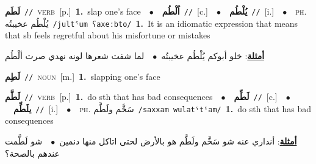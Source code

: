 \documentclass[10pt,a4paper,twoside]{article} %
\begin{document}
\begin{multicols}{2}
{\setlength\topsep{0pt}\textbf{\foreignlanguage{arabic}{لَطَم}}\ {\color{gray}\texttt{//}\color{black}}\ \textsc{verb}\ [p.]\ \textbf{1.}~slap one's face\ \ $\bullet$\ \ \setlength\topsep{0pt}\textbf{\foreignlanguage{arabic}{اُلْطُم}}\ {\color{gray}\texttt{//}\color{black}}\ [c.]\ \ $\bullet$\ \ \setlength\topsep{0pt}\textbf{\foreignlanguage{arabic}{يُلْطُم}}\ {\color{gray}\texttt{//}\color{black}}\ [i.]\ \ $\bullet$\ \ \textsc{ph.} \color{gray} \foreignlanguage{arabic}{يُلْطُم عخيبتُه}\color{black}\ {\color{gray}\texttt{/{\sffamily jultˤum ʕaxeːbto}/}\color{black}}\ \textbf{1.}~It is an idiomatic expression that means  that sb feels regretful about his misfortune or mistakes\  \begin{flushright}\color{gray}\foreignlanguage{arabic}{\textbf{\underline{\foreignlanguage{arabic}{أمثلة}}}: خلو أبوكم يُلْطُم عخيبتُه\ $\bullet$\ \  لما شفت شعرها لونه نهدي صرت ألْطُم}\end{flushright}\color{black}} \vspace{2mm}

{\setlength\topsep{0pt}\textbf{\foreignlanguage{arabic}{لَطِم}}\ {\color{gray}\texttt{//}\color{black}}\ \textsc{noun}\ [m.]\ \textbf{1.}~slapping one's face\ } \vspace{2mm}

{\setlength\topsep{0pt}\textbf{\foreignlanguage{arabic}{لَطَّم}}\ {\color{gray}\texttt{//}\color{black}}\ \textsc{verb}\ [p.]\ \textbf{1.}~do sth that has bad consequences\ \ $\bullet$\ \ \setlength\topsep{0pt}\textbf{\foreignlanguage{arabic}{لَطِّم}}\ {\color{gray}\texttt{//}\color{black}}\ [c.]\ \ $\bullet$\ \ \setlength\topsep{0pt}\textbf{\foreignlanguage{arabic}{يلَطِّم}}\ {\color{gray}\texttt{//}\color{black}}\ [i.]\ \ $\bullet$\ \ \textsc{ph.} \color{gray} \foreignlanguage{arabic}{سَخَّم ولَطَّم}\color{black}\ {\color{gray}\texttt{/{\sffamily saxxam wulatˤtˤam}/}\color{black}}\ \textbf{1.}~do sth that has bad consequences\  \begin{flushright}\color{gray}\foreignlanguage{arabic}{\textbf{\underline{\foreignlanguage{arabic}{أمثلة}}}: أنداري عنه شو سَخَّم ولَطَّم هو بالأرض لحتى اتاكل منها دنمين\ $\bullet$\ \  شو لَطَّمت عندهم بالصحة؟}\end{flushright}\color{black}} \vspace{2mm}


\end{multicols}
\end{document}
